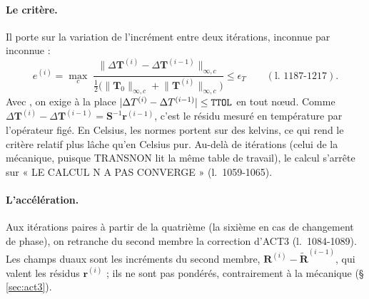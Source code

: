\documentclass[11pt,a4paper]{article}
\numberwithin{equation}{section}
\newcommand{\src}[1]{\texttt{\detokenize{#1}}}          %
\newcommand{\pr}[1]{\textsf{#1}}                        %
\newcommand{\op}[1]{\textsf{\small #1}}                 %
\newcommand{\lig}[1]{l.~#1}
\newcommand{\vc}[1]{\symbf{#1}}                         %
\begin{document}
\paragraph{Le critère.}
Il porte sur la variation de l'incrément entre deux itérations, inconnue par inconnue :
\begin{equation}
\label{eq:critere-th}
e^{(i)} = \max_c\;\frac{\lVert \Delta\vc T^{(i)} - \Delta\vc T^{(i-1)}\rVert_{\infty,c}}{\tfrac12\big(\lVert \vc T_0\rVert_{\infty,c} + \lVert \vc T^{(i)}\rVert_{\infty,c}\big)} \le \epsilon_T
\qquad(\text{\lig{1187-1217}}).
\end{equation}
Avec \src{TTOL}, on exige à la place $|\Delta T^{(i)} - \Delta T^{(i-1)}| \le \src{TTOL}$ en tout nœud.
Comme $\Delta\vc T^{(i)} - \Delta\vc T^{(i-1)} = \vc S^{-1}\vc r^{(i-1)}$, c'est le résidu mesuré en température par l'opérateur figé.
En Celsius, les normes portent sur des kelvins, ce qui rend le critère relatif plus lâche qu'en Celsius pur.
Au-delà de \src{MAXITERATION} itérations (celui de la mécanique, puisque \pr{TRANSNON} lit la même table de travail), le calcul s'arrête sur « LE CALCUL N A PAS CONVERGE » (\lig{1059-1065}).

\paragraph{L'accélération.}
Aux itérations paires à partir de la quatrième (la sixième en cas de changement de phase), on retranche du second membre la correction d'\op{ACT3} (\lig{1084-1089}).
Les champs duaux sont les incréments du second membre, $\vc R^{(i)} - \tilde{\vc R}^{(i-1)}$, qui valent les résidus $\vc r^{(i)}$ ; ils ne sont pas pondérés, contrairement à la mécanique (§ \ref{sec:act3}).
\end{document}
